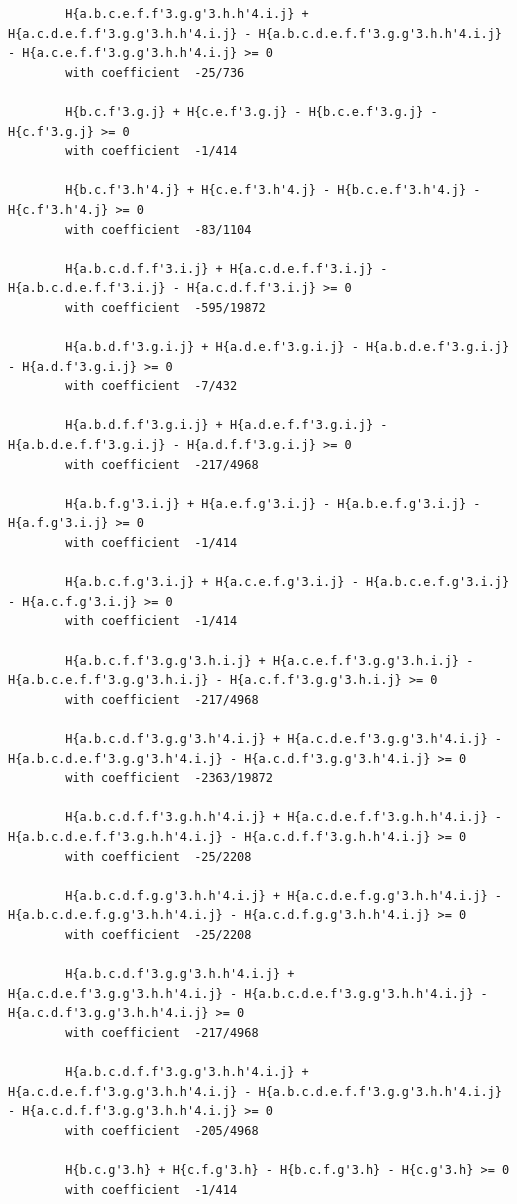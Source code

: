 \documentclass[11pt, a4paper]{kybernetika}
\begin{document}
\begin{verbatim}
		H{a.b.c.e.f.f'3.g.g'3.h.h'4.i.j} + H{a.c.d.e.f.f'3.g.g'3.h.h'4.i.j} - H{a.b.c.d.e.f.f'3.g.g'3.h.h'4.i.j} - H{a.c.e.f.f'3.g.g'3.h.h'4.i.j} >= 0
		with coefficient  -25/736
		
		H{b.c.f'3.g.j} + H{c.e.f'3.g.j} - H{b.c.e.f'3.g.j} - H{c.f'3.g.j} >= 0
		with coefficient  -1/414
		
		H{b.c.f'3.h'4.j} + H{c.e.f'3.h'4.j} - H{b.c.e.f'3.h'4.j} - H{c.f'3.h'4.j} >= 0
		with coefficient  -83/1104
		
		H{a.b.c.d.f.f'3.i.j} + H{a.c.d.e.f.f'3.i.j} - H{a.b.c.d.e.f.f'3.i.j} - H{a.c.d.f.f'3.i.j} >= 0
		with coefficient  -595/19872
		
		H{a.b.d.f'3.g.i.j} + H{a.d.e.f'3.g.i.j} - H{a.b.d.e.f'3.g.i.j} - H{a.d.f'3.g.i.j} >= 0
		with coefficient  -7/432
		
		H{a.b.d.f.f'3.g.i.j} + H{a.d.e.f.f'3.g.i.j} - H{a.b.d.e.f.f'3.g.i.j} - H{a.d.f.f'3.g.i.j} >= 0
		with coefficient  -217/4968
		
		H{a.b.f.g'3.i.j} + H{a.e.f.g'3.i.j} - H{a.b.e.f.g'3.i.j} - H{a.f.g'3.i.j} >= 0
		with coefficient  -1/414
		
		H{a.b.c.f.g'3.i.j} + H{a.c.e.f.g'3.i.j} - H{a.b.c.e.f.g'3.i.j} - H{a.c.f.g'3.i.j} >= 0
		with coefficient  -1/414
		
		H{a.b.c.f.f'3.g.g'3.h.i.j} + H{a.c.e.f.f'3.g.g'3.h.i.j} - H{a.b.c.e.f.f'3.g.g'3.h.i.j} - H{a.c.f.f'3.g.g'3.h.i.j} >= 0
		with coefficient  -217/4968
		
		H{a.b.c.d.f'3.g.g'3.h'4.i.j} + H{a.c.d.e.f'3.g.g'3.h'4.i.j} - H{a.b.c.d.e.f'3.g.g'3.h'4.i.j} - H{a.c.d.f'3.g.g'3.h'4.i.j} >= 0
		with coefficient  -2363/19872
		
		H{a.b.c.d.f.f'3.g.h.h'4.i.j} + H{a.c.d.e.f.f'3.g.h.h'4.i.j} - H{a.b.c.d.e.f.f'3.g.h.h'4.i.j} - H{a.c.d.f.f'3.g.h.h'4.i.j} >= 0
		with coefficient  -25/2208
		
		H{a.b.c.d.f.g.g'3.h.h'4.i.j} + H{a.c.d.e.f.g.g'3.h.h'4.i.j} - H{a.b.c.d.e.f.g.g'3.h.h'4.i.j} - H{a.c.d.f.g.g'3.h.h'4.i.j} >= 0
		with coefficient  -25/2208
		
		H{a.b.c.d.f'3.g.g'3.h.h'4.i.j} + H{a.c.d.e.f'3.g.g'3.h.h'4.i.j} - H{a.b.c.d.e.f'3.g.g'3.h.h'4.i.j} - H{a.c.d.f'3.g.g'3.h.h'4.i.j} >= 0
		with coefficient  -217/4968
		
		H{a.b.c.d.f.f'3.g.g'3.h.h'4.i.j} + H{a.c.d.e.f.f'3.g.g'3.h.h'4.i.j} - H{a.b.c.d.e.f.f'3.g.g'3.h.h'4.i.j} - H{a.c.d.f.f'3.g.g'3.h.h'4.i.j} >= 0
		with coefficient  -205/4968
		
		H{b.c.g'3.h} + H{c.f.g'3.h} - H{b.c.f.g'3.h} - H{c.g'3.h} >= 0
		with coefficient  -1/414
		

\end{verbatim}
\end{document}
